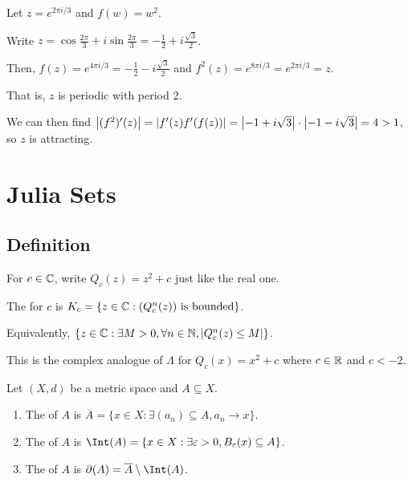 \documentclass[class=pmath370,tikz,notes]{agony}
\begin{document}
\begin{example}
  Let $z = e^{2\pi i/3}$ and $f(w) = w^2$.
\end{example}
\begin{sol}
  Write $z = \cos\frac{2\pi}{3} + i\sin\frac{2\pi}{3} = -\frac12 + i\frac{\sqrt3}2$.

  Then, $f(z) = e^{4\pi i/3} = -\frac12 - i\frac{\sqrt3}{2}$
  and $f^2(z) = e^{8\pi i/3} = e^{2\pi i/3} = z$.

  That is, $z$ is periodic with period 2.

  We can then find $\abs{(f^2)'(z)} = \abs{f'(z)f'(f(z))} = \abs{-1+i\sqrt3}\cdot\abs{-1-i\sqrt3} = 4 > 1$,
  so $z$ is attracting.
\end{sol}

\chapter{Julia Sets}

\section{Definition}

\begin{notation}
  For $c \in \mathbb{C}$, write $Q_c(z) = z^2 + c$ just like the real one.
\end{notation}

\begin{defn}
  The  for $c$ is $K_c = \qty{z \in \ensuremath{\mathbb{C}}: \text{$(Q_c^n(z))$ is bounded}}$.

  Equivalently, $\qty{z \in \ensuremath{\mathbb{C}}: \exists M > 0, \forall n \in \ensuremath{\mathbb{N}}, \abs{Q_c^n(z) \leq M}}$.
\end{defn}

\begin{remark}
  This is the complex analogue of $\Lambda$ for $Q_c(x) = x^2 + c$
  where $c \in \mathbb{R}$ and $c < -2$.
\end{remark}

\begin{defn}
  Let $(X,d)$ be a metric space and $A \subseteq X$.
  \begin{enumerate}[nosep]
    \item The  of $A$ is $\overline{A} = \{x \in X : \exists (a_n) \subseteq A, a_n \to x\}$.
    \item The  of $A$ is $\Int(A) = \{x \in X : \exists \varepsilon>0,B_\varepsilon(x) \subseteq A\}$.
    \item The  of $A$ is $\partial(A) = \overline{A} \setminus \Int(A)$.
  \end{enumerate}
\end{defn}
\end{document}

